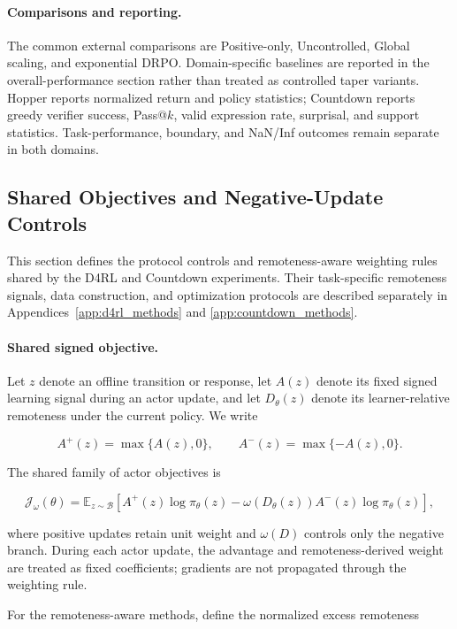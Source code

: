 \documentclass{article}
\theoremstyle{plain}
\theoremstyle{definition}
\theoremstyle{remark}
\begin{document}
\paragraph{Comparisons and reporting.}
The common external comparisons are Positive-only, Uncontrolled,
Global scaling, and exponential DRPO. Domain-specific baselines are
reported in the overall-performance section rather than treated as
controlled taper variants. Hopper reports normalized return and policy
statistics; Countdown reports greedy verifier success, Pass@$k$, valid
expression rate, surprisal, and support statistics. Task-performance,
boundary, and NaN/Inf outcomes remain separate in both domains.
\subsection{Shared Objectives and Negative-Update Controls}
\label{app:shared_methods}

This section defines the protocol controls and remoteness-aware
weighting rules shared by the D4RL and Countdown experiments. Their
task-specific remoteness signals, data construction, and optimization
protocols are described separately in
Appendices~\ref{app:d4rl_methods} and
\ref{app:countdown_methods}.

\paragraph{Shared signed objective.}

Let \(z\) denote an offline transition or response, let
\(A(z)\) denote its fixed signed learning signal during an actor update,
and let \(D_\theta(z)\) denote its learner-relative remoteness under the
current policy. We write

\[
A^{+}(z)=\max\{A(z),0\},
\qquad
A^{-}(z)=\max\{-A(z),0\}.
\]

The shared family of actor objectives is

\[
\mathcal{J}_{\omega}(\theta)
=
\mathbb{E}_{z\sim\mathcal{B}}
\left[
A^{+}(z)\log \pi_\theta(z)
 -
\omega\!\left(D_\theta(z)\right)
A^{-}(z)\log \pi_\theta(z)
\right],
\]

where positive updates retain unit weight and
\(\omega(D)\) controls only the negative branch. During each actor
update, the advantage and remoteness-derived weight are treated as
fixed coefficients; gradients are not propagated through the weighting
rule.

For the remoteness-aware methods, define the normalized excess
remoteness
\end{document}
